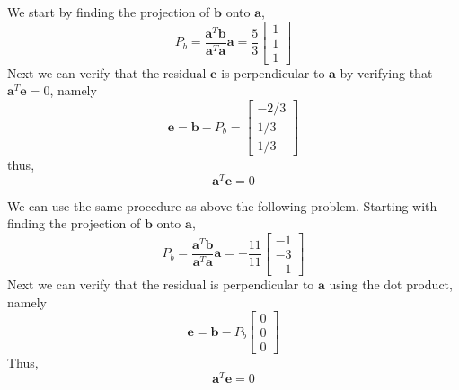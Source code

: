 \begin{mdframed}[style=MyFrame]
    We start by finding the projection of $\mathbf{b}$ onto $\mathbf{a}$,
    \begin{equation}
        P_{b}   =  \frac{\mathbf{a}^{T}\mathbf{b}}
                        {\mathbf{a}^{T}\mathbf{a}}
                        \mathbf{a}
                = \frac{5}{3}
                    \begin{bmatrix}
                        1   \\
                        1   \\
                        1
                    \end{bmatrix}
    \end{equation}
    Next we can verify that the residual $\mathbf{e}$ is perpendicular to
    $\mathbf{a}$  by verifying that $\mathbf{a}^{T}\mathbf{e}=0$, namely
    \begin{equation}
        \mathbf{e}  =
                    \mathbf{b} - P_{b} 
                    =
                    \begin{bmatrix}
                        -2/3    \\
                        1/3     \\
                        1/3
                    \end{bmatrix}
    \end{equation}
    thus, 
    \begin{equation}
        \mathbf{a}^{T}\mathbf{e} = 0
    \end{equation}

    We can use the same procedure as above the following problem. Starting
    with finding the projection of $\mathbf{b}$ onto $\mathbf{a}$,
    \begin{equation}
        P_{b} =
                \frac{\mathbf{a}^{T}\mathbf{b}}
                        {\mathbf{a}^{T}\mathbf{a}}
                        \mathbf{a}
                =
                -\frac{11}{11}
                \begin{bmatrix}
                    -1      \\
                    -3      \\
                    -1
                \end{bmatrix}
    \end{equation}
    Next we can verify that the residual is perpendicular to $\mathbf{a}$
    using the dot product, namely
    \begin{equation}
        \mathbf{e}  = \mathbf{b} - P_{b}
                        \begin{bmatrix}
                            0       \\
                            0       \\
                            0
                        \end{bmatrix}
    \end{equation}
    Thus,
    \begin{equation}
        \mathbf{a}^{T}\mathbf{e} = 0
    \end{equation}
\end{mdframed}
                    
